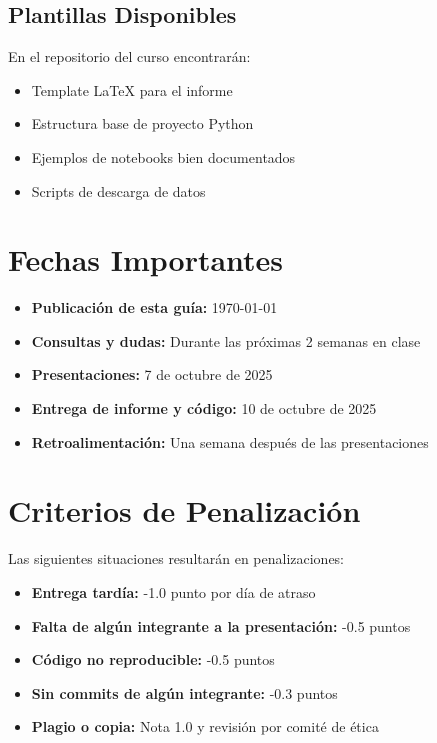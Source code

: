 \documentclass[11pt,letterpaper]{article}
\begin{document}
\subsection{Plantillas Disponibles}

En el repositorio del curso encontrarán:
\begin{itemize}
    \item Template LaTeX para el informe
    \item Estructura base de proyecto Python
    \item Ejemplos de notebooks bien documentados
    \item Scripts de descarga de datos
\end{itemize}

\section{Fechas Importantes}

\begin{tcolorbox}[colback=warningyellow!20, colframe=warningyellow!80]
\begin{itemize}
    \item \textbf{Publicación de esta guía:} \today
    \item \textbf{Consultas y dudas:} Durante las próximas 2 semanas en clase
    \item \textbf{Presentaciones:} 7 de octubre de 2025
    \item \textbf{Entrega de informe y código:} 10 de octubre de 2025
    \item \textbf{Retroalimentación:} Una semana después de las presentaciones
\end{itemize}
\end{tcolorbox}

\section{Criterios de Penalización}

\begin{warning}
Las siguientes situaciones resultarán en penalizaciones:
\end{warning}

\begin{itemize}
    \item \textbf{Entrega tardía:} -1.0 punto por día de atraso
    \item \textbf{Falta de algún integrante a la presentación:} -0.5 puntos
    \item \textbf{Código no reproducible:} -0.5 puntos
    \item \textbf{Sin commits de algún integrante:} -0.3 puntos
    \item \textbf{Plagio o copia:} Nota 1.0 y revisión por comité de ética
\end{itemize}
\end{document}
